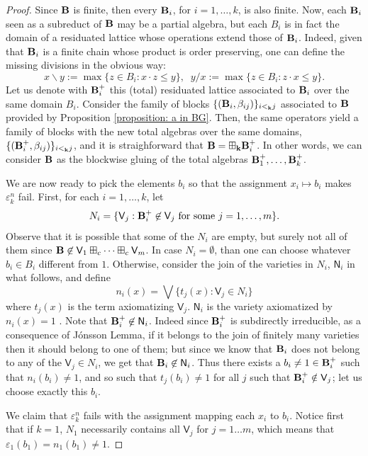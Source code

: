 \documentclass{amsart}
\theoremstyle{definition}
\numberwithin{equation}{section}
\newcommand{\alg}[1]{{\textbf{\upshape #1}}}  %
\newcommand{\vv}[1]{\mathsf {#1}}
\newcommand{\betaij}{\beta_{ij}}
\begin{document}
\begin{proof}
	Since $\alg B$ is finite, then every $\alg B_i$, for $i= 1, \dots , k$, is also finite. Now, each $\alg B_i$ seen as a subreduct of $\alg B$ may be a partial algebra, but each $B_i$ is in fact the domain of a residuated lattice whose operations extend those of $\alg B_i$. Indeed, given that $\alg B_i$ is a finite chain whose product is order preserving, one can define the missing divisions in the obvious way:
	$$x \backslash y := \max \{ z \in B_i : x \cdot z \leq y \}, \;\; y /x := \max \{ z \in B_i : z \cdot x \leq y \}.$$
	Let us denote with $\alg B_i^{+}$ this (total) residuated lattice associated to $\alg B_i$ over the same domain $B_i$.
	  Consider the family of blocks $\{(\alg B_i, \betaij)\}_{i<_{\bf k}j}$ associated to $\alg B$ provided by Proposition \ref{proposition: a in BG}. Then, the same operators yield a family of blocks with the new total algebras over the same domains, $\{(\alg B^+_i, \betaij)\}_{i<_{\bf k}j}$, and it is straighforward that $\alg B =  \boxplus_{\bf k} \alg B_i^+$. In other words, we can consider $\alg B$ as the blockwise gluing of the total algebras $\alg B_1^+, \dots , \alg B_k^+$. 
	  
	  We are now ready to pick the elements $b_i$ so that the assignment $x_i \mapsto b_i$ makes $\varepsilon_k^n$ fail. First, for each $i=1, \dots, k$, let 
	$$N_i=\{\vv V_j : \alg B^+_i \not \in \vv V_j \mbox{ for some } j= 1 , \dots , m \}.$$ 
	Observe that it is possible that some of the $N_i$ are empty, but surely not all of them since $\alg B \not \in \vv V_1 \boxplus_c \dots \boxplus_c \vv V_m$. In case $N_i= \emptyset$, than one can choose whatever $b_i\in B_i$ different from $1$. Otherwise, consider the join of the varieties in $N_i$, $\vv N_i$ in what follows, and define
	$$
	n_i(x)= \bigvee \{ t_j(x) : \vv V_j \in N_i \}
	$$
	where $t_j(x)$ is the term axiomatizing $\vv V_j$. $\vv N_i$ is the variety axiomatized by $n_i(x)=1$ \cite[Corollary 4.3]{Galatos04}. Note that $\alg B^+_i \not \in \vv N_i$. Indeed since $\alg B^+_i$ is subdirectly irreducible, as a consequence of J\'onsson Lemma, if it belongs to the join of finitely many varieties then it should belong to one of them; but since we know that $\alg B_i$ does not belong to any of the $\vv V_j \in N_i$, we get that $\alg B_i \not \in \vv N_i$. Thus there exists a $b_i\neq 1 \in \alg B^+_i$ such that $n_i(b_i)\neq 1$, and so such that $t_j(b_i) \neq 1$ for all $j$ such that $\alg B_i^+ \notin \vv V_j$; let us choose exactly this $b_i$. 
	
We claim that $\varepsilon_k^n$ fails with the assignment mapping each $x_i$ to $b_i$. Notice first that if $k=1$, $N_1$ necessarily contains all $\vv V_j$ for $j = 1 \ldots m$, which means that $\varepsilon_1(b_1)=n_1(b_1) \neq 1$.


\end{proof}
\end{document}

